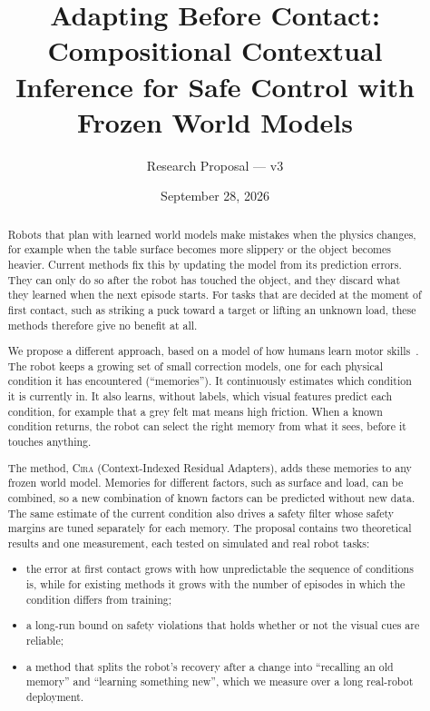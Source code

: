 \documentclass[10pt]{article}
\title{Adapting Before Contact:\\
Compositional Contextual Inference for Safe Control with Frozen World Models}
\author{Research Proposal --- v3}
\date{September 28, 2026}
\newcommand{\method}{\textsc{Cira}}
\begin{document}
\maketitle

\begin{abstract}
Robots that plan with learned world models make mistakes when the physics changes, for example when
the table surface becomes more slippery or the object becomes heavier. Current methods fix this by
updating the model from its prediction errors. They can only do so after the robot has touched the
object, and they discard what they learned when the next episode starts. For tasks that are decided at
the moment of first contact, such as striking a puck toward a target or lifting an unknown load, these
methods therefore give no benefit at all.

We propose a different approach, based on a model of how humans learn motor skills~\cite{heald2021coin}.
The robot keeps a growing set of small correction models, one for each physical condition it has
encountered (``memories''). It continuously estimates which condition it is currently in. It also
learns, without labels, which visual features predict each condition, for example that a grey felt mat
means high friction. When a known condition returns, the robot can select the right memory from what
it sees, before it touches anything.

The method, \method{} (Context-Indexed Residual Adapters), adds these memories to any frozen world
model. Memories for different factors, such as surface and load, can be combined, so a new combination
of known factors can be predicted without new data. The same estimate of the current condition also
drives a safety filter whose safety margins are tuned separately for each memory. The proposal contains two theoretical results and one measurement, each tested on simulated and
real robot tasks:
\begin{itemize}
  \item the error at first contact grows with how unpredictable the sequence of conditions is, while
  for existing methods it grows with the number of episodes in which the condition differs from
  training;
  \item a long-run bound on safety violations that holds whether or not the visual cues are reliable;
  \item a method that splits the robot's recovery after a change into ``recalling an old memory'' and
  ``learning something new'', which we measure over a long real-robot deployment.
\end{itemize}
\end{abstract}
\end{document}

